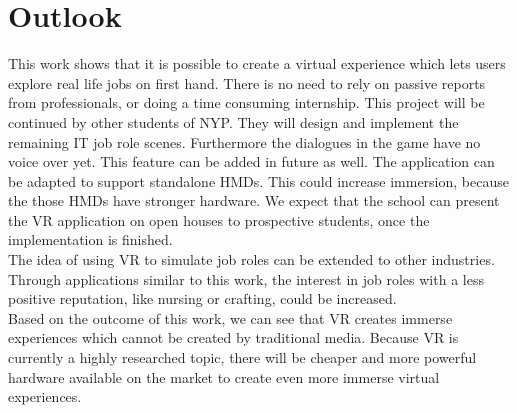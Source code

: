 \section{Outlook}
This work shows that it is possible to create a virtual experience which lets users explore real life jobs on first hand. There is no need to rely on passive reports from professionals, or doing a time consuming internship. This project will be continued by other students of NYP. They will design and implement the remaining IT job role scenes. Furthermore the dialogues in the game have no voice over yet. This feature can be added in future as well. The application can be adapted to support  standalone HMDs. This could increase immersion, because the those HMDs have stronger hardware. We expect that the school can present the VR application on open houses to prospective students, once the implementation is finished. \\The idea of using VR to simulate job roles can be extended to other industries. Through applications similar to this work, the interest in job roles with a less positive reputation,  like nursing or crafting, could be increased.\\
Based on the outcome of this work, we can see that VR creates immerse experiences which cannot be created by traditional media. Because VR is currently a highly researched topic, there will be cheaper and more powerful hardware available on the market to create even more immerse virtual experiences. 
